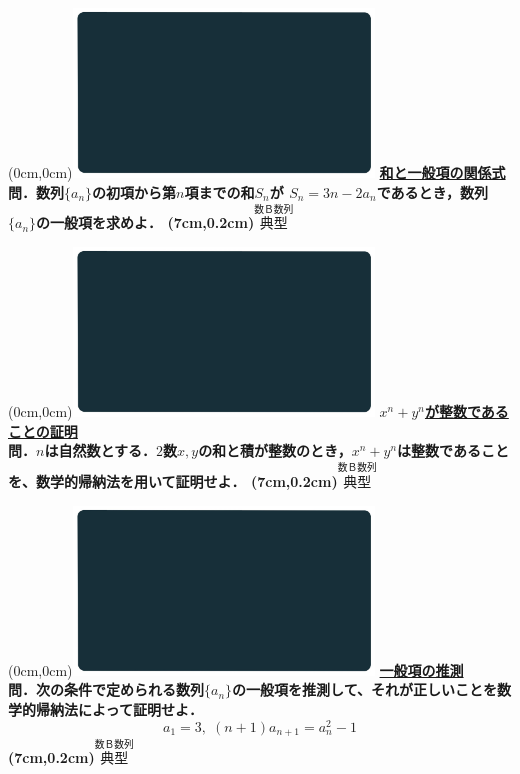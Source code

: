 \documentclass[10pt,
fleqn,
dvipdfmx,
uplatex
]{jsarticle}
\begin{document}
\newpage

\at(0cm,0cm){\includegraphics[width=8cm,bb=0 0 1920 1080]{./youtube/thumbnails/templates/smart_background/数B数列.jpeg}}
{\color{orange}\bf\boldmath\Large\underline{和と一般項の関係式}}\vspace{0.3zw}\\
\Large 
\bf\boldmath 問．数列$\{a_n\}$の初項から第$n$項までの和$S_n$が
$S_n=3n-2a_n$であるとき，数列$\{a_n\}$の一般項を求めよ．
\at(7cm,0.2cm){\small\color{bradorange}$\overset{\text{数Ｂ数列}}{\text{典型}}$}

\newpage

\at(0cm,0cm){\includegraphics[width=8cm,bb=0 0 1920 1080]{./youtube/thumbnails/templates/smart_background/数B数列.jpeg}}
{\color{orange}\bf\boldmath\large\underline{$x^n+y^n$が整数であることの証明}}\vspace{0.3zw}\\
\Large 
\bf\boldmath 問．$n$は自然数とする．$2$数$x,y$の和と積が整数のとき，$x^n+y^n$は整数であることを、数学的帰納法を用いて証明せよ．
\at(7cm,0.2cm){\small\color{bradorange}$\overset{\text{数Ｂ数列}}{\text{典型}}$}

\newpage

\at(0cm,0cm){\includegraphics[width=8cm,bb=0 0 1920 1080]{./youtube/thumbnails/templates/smart_background/数B数列.jpeg}}
{\color{orange}\bf\boldmath\Large\underline{一般項の推測}}\vspace{0.3zw}\\
\large 
\bf\boldmath 問．次の条件で定められる数列$\{a_n\}$の一般項を推測して、それが正しいことを数学的帰納法によって証明せよ．
\[a_1=3,\;\left(n+1\right)a_{n+1}=a_n^2-1\]
\at(7cm,0.2cm){\small\color{bradorange}$\overset{\text{数Ｂ数列}}{\text{典型}}$}
\end{document}
